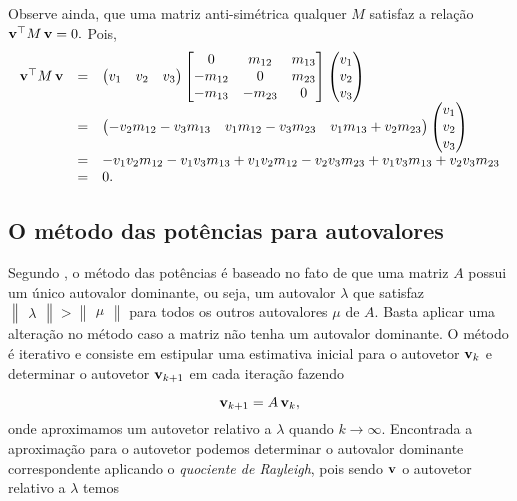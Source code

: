 Observe ainda, que uma matriz anti-simétrica qualquer $M$ satisfaz a relação ${\bf v}^\top M\,{\bf v}=0.$ Pois,
\begin{equation*}
\begin{array}{rcl}
{\bf v}^\top M\,{\bf v}
&=&
\begin{pmatrix}
v_1&v_2&v_3
\end{pmatrix}
\begin{bmatrix}
0&m_{12}&m_{13}\\
-m_{12}&0&m_{23}\\
-m_{13}&-m_{23}&0
\end{bmatrix}
\begin{pmatrix}
v_1\\
v_2\\
v_3
\end{pmatrix}\\
&=&
\begin{pmatrix}
-v_2 m_{12}-v_3 m_{13}&v_1 m_{12}-v_3 m_{23}&v_1 m_{13}+v_2 m_{23}
\end{pmatrix}
\begin{pmatrix}
v_1\\
v_2\\
v_3
\end{pmatrix}\\
&=&
-v_1 v_2 m_{12}-v_1 v_3 m_{13}+v_1 v_2 m_{12}-v_2 v_3 m_{23}+v_1 v_3 m_{13}+v_2 v_3 m_{23}\\
&=&0.
\end{array}
\end{equation*}

\subsection*{O método das potências para autovalores}
Segundo \citep{cox-using}, o método das potências é baseado no fato de que uma matriz $A$ possui um único autovalor dominante, ou seja, um autovalor $\lambda$ que satisfaz $\begin{Vmatrix}\lambda\end{Vmatrix} > \begin{Vmatrix}\mu\end{Vmatrix}$ para todos os outros autovalores $\mu$ de $A$. Basta aplicar uma alteração no método caso a matriz não tenha um autovalor dominante. O método é iterativo e consiste em estipular uma estimativa inicial para o autovetor ${\bf v}_k$ e determinar o autovetor ${\bf v}_{k+1}$ em cada iteração fazendo

\begin{equation*}
{\bf v}_{k+1}=A\,{\bf v}_k,
\end{equation*}
onde aproximamos um autovetor relativo a $\lambda$ quando $k\rightarrow \infty$. Encontrada a aproximação para o autovetor podemos determinar o autovalor dominante correspondente aplicando o \textit{quociente de Rayleigh}, pois sendo ${\bf v}$ o autovetor relativo a $\lambda$ temos

